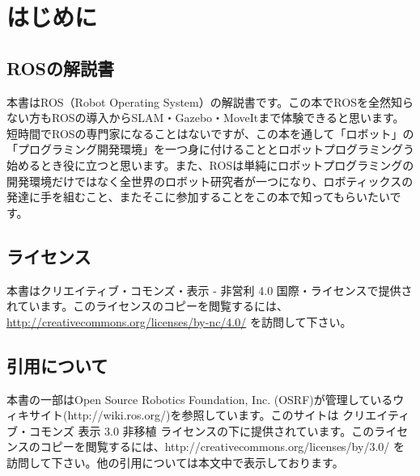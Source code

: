 \chapter*{はじめに}

\section*{ROSの解説書}

本書はROS（Robot Operating System）の解説書です。この本でROSを全然知らない方もROSの導入からSLAM・Gazebo・MoveItまで体験できると思います。短時間でROSの専門家になることはないですが、この本を通して「ロボット」の「プログラミング開発環境」を一つ身に付けることとロボットプログラミングう始めるとき役に立つと思います。また、ROSは単純にロボットプログラミングの開発環境だけではなく全世界のロボット研究者が一つになり、ロボティックスの発達に手を組むこと、またそこに参加することをこの本で知ってもらいたいです。


\section*{ライセンス}

本書はクリエイティブ・コモンズ・表示 - 非営利 4.0 国際・ライセンスで提供されています。このライセンスのコピーを閲覧するには、 \url{http://creativecommons.org/licenses/by-nc/4.0/} を訪問して下さい。

\section*{引用について}

本書の一部はOpen Source Robotics Foundation, Inc. (OSRF)が管理しているウィキサイト(http://wiki.ros.org/)を参照しています。このサイトは クリエイティブ・コモンズ 表示 3.0 非移植 ライセンスの下に提供されています。このライセンスのコピーを閲覧するには、http://creativecommons.org/licenses/by/3.0/ を訪問して下さい。他の引用については本文中で表示しております。

